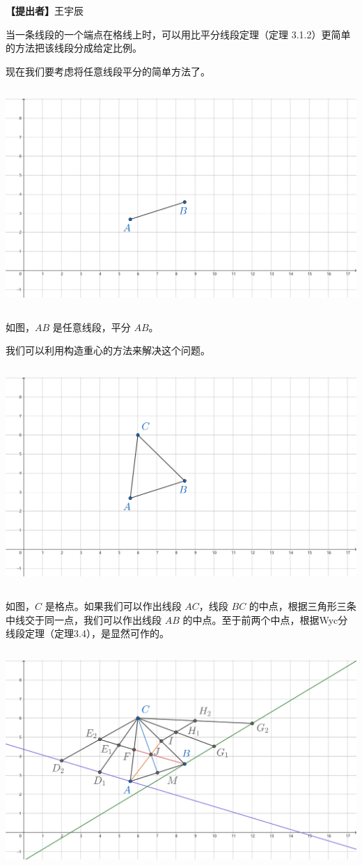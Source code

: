 \documentclass[UTF8]{article}
\begin{document}
\textbf{【提出者】}王宇辰

当一条线段的一个端点在格线上时，可以用比平分线段定理（定理
3.1.2）更简单的方法把该线段分成给定比例。

现在我们要考虑将任意线段平分的简单方法了。

\includegraphics[width=5.76806in,height=3.27847in]{media/image23.png}

如图，\(AB\) 是任意线段，平分 \(AB\)。

我们可以利用构造重心的方法来解决这个问题。

\includegraphics[width=5.76806in,height=3.27847in]{media/image24.png}

如图，\(C\) 是格点。如果我们可以作出线段 \(AC\)，线段 \(BC\)
的中点，根据三角形三条中线交于同一点，我们可以作出线段 \(AB\)
的中点。至于前两个中点，根据Wyc分线段定理（定理3.4），是显然可作的。

\includegraphics[width=5.76806in,height=3.27292in]{media/image25.png}
\end{document}
